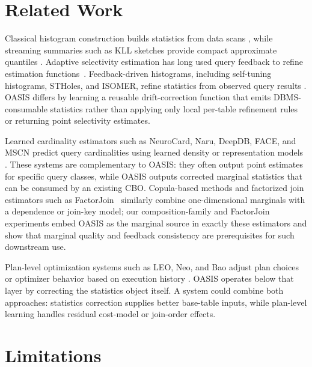 \documentclass[preprint,12pt]{elsarticle}
\begin{document}
\section{Related Work}
\label{sec:related}

Classical histogram construction builds statistics from data scans
\cite{ioannidis1993histogram,poosala1997selectivity}, while streaming
summaries such as KLL sketches provide compact approximate quantiles
\cite{ivkin2019kll}. Adaptive selectivity estimation has long used query
feedback to refine estimation functions~\cite{chen1994adaptive}.
Feedback-driven histograms, including self-tuning histograms, STHoles, and
ISOMER, refine statistics from observed query results
\cite{aboulnaga1999self,bruno2001stholes,markl2007consistent}. OASIS differs
by learning a reusable drift-correction function that emits DBMS-consumable
statistics rather than applying only local per-table refinement rules or
returning point selectivity estimates.

Learned cardinality estimators such as NeuroCard, Naru, DeepDB, FACE, and MSCN
predict query cardinalities using learned density or representation models
\cite{yang2020neurocard,yang2019deep,hilprecht2019deepdb,yang2020face,kipf2019learned}.
These systems are complementary to OASIS: they often output point estimates for
specific query classes, while OASIS outputs corrected marginal statistics that
can be consumed by an existing CBO. Copula-based methods and factorized join
estimators such as FactorJoin~\cite{wu2023factorjoin} similarly combine
one-dimensional marginals with a dependence or join-key model; our
composition-family and FactorJoin experiments embed OASIS as the marginal source
in exactly these estimators and show that marginal quality and feedback
consistency are prerequisites for such downstream use.

Plan-level optimization systems such as LEO, Neo, and Bao adjust plan choices
or optimizer behavior based on execution history
\cite{stillger2001leo,marcus2019neo,marcus2022bao}. OASIS operates below that
layer by correcting the statistics object itself. A system could combine both
approaches: statistics correction supplies better base-table inputs, while
plan-level learning handles residual cost-model or join-order effects.

\section{Limitations}
\label{sec:limitations}
\end{document}
